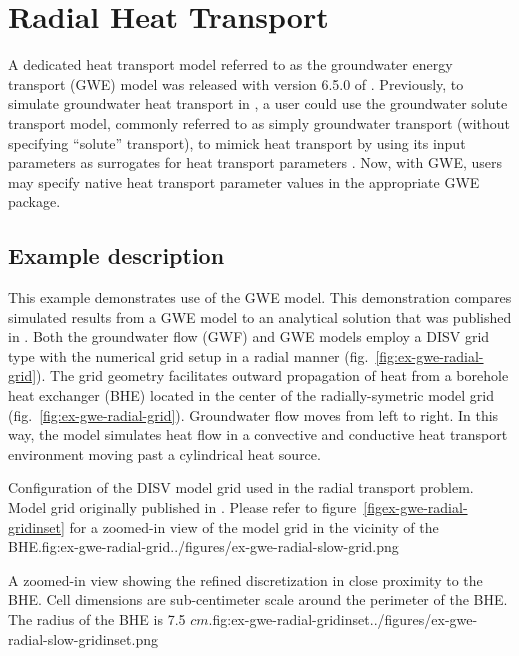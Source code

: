 \section{Radial Heat Transport}

A dedicated heat transport model referred to as the groundwater energy transport (GWE) model was released with version 6.5.0 of \mf. Previously, to simulate groundwater heat transport in \mf, a user could use the groundwater solute transport model, commonly referred to as simply groundwater transport (without specifying ``solute'' transport), to mimick heat transport by using its input parameters as surrogates for heat transport parameters \citep{modflow6gwt, ma2010, langevin2008seawat}. Now, with GWE, users may specify native heat transport parameter values in the appropriate GWE package.

\subsection{Example description}

This example demonstrates use of the GWE model.  This demonstration compares simulated results from a GWE model to an analytical solution that was published in \cite{alKhoury2020}.  Both the groundwater flow (GWF) and GWE models employ a DISV grid type \citep{modflow6software} with the numerical grid setup in a radial manner (fig.~\ref{fig:ex-gwe-radial-grid}). The grid geometry facilitates outward propagation of heat from a borehole heat exchanger (BHE) \citep{hechtMendez2010} located in the center of the radially-symetric model grid (fig.~\ref{fig:ex-gwe-radial-grid}). Groundwater flow moves from left to right. In this way, the model simulates heat flow in a convective and conductive heat transport environment moving past a cylindrical heat source.

\begin{StandardFigure}{
    Configuration of the DISV model grid used in the radial transport problem.  Model grid originally published in \cite{alKhoury2020}.  Please refer to figure~\ref{figex-gwe-radial-gridinset} for a zoomed-in view of the model grid in the vicinity of the BHE.}{fig:ex-gwe-radial-grid}{../figures/ex-gwe-radial-slow-grid.png}
\end{StandardFigure}

\begin{StandardFigure}{
    A zoomed-in view showing the refined discretization in close proximity to the BHE.  Cell dimensions are sub-centimeter scale around the perimeter of the BHE.  The radius of the BHE is 7.5 $cm$.}{fig:ex-gwe-radial-gridinset}{../figures/ex-gwe-radial-slow-gridinset.png}
\end{StandardFigure}


